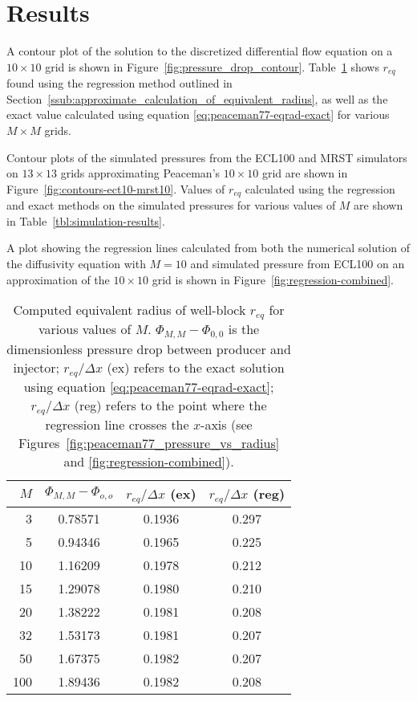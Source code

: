 
\section{Results} %
\label{sec:results}
A contour plot of the solution to the discretized differential flow equation on a $10 \times 10$ grid is shown in Figure~\ref{fig:pressure_drop_contour}. Table~\ref{tbl:peaceman-results} shows $r_{eq}$ found using the regression method outlined in Section~\ref{ssub:approximate_calculation_of_equivalent_radius}, as well as the exact value calculated using equation \eqref{eq:peaceman77-eqrad-exact} for various $M\times M$ grids.

Contour plots of the simulated pressures from the ECL100 and MRST simulators on $13\times 13$ grids approximating Peaceman's $10\times 10$ grid are shown in Figure~\ref{fig:contours-ect10-mrst10}. Values of $r_{eq}$ calculated using the regression and exact methods on the simulated pressures for various values of $M$ are shown in Table~\ref{tbl:simulation-results}.

A plot showing the regression lines calculated from both the numerical solution of the diffusivity equation with $M=10$ and simulated pressure from ECL100 on an approximation of the $10\times 10$ grid is shown in Figure~\ref{fig:regression-combined}.



\begin{table}[htbp]
    \centering
    \caption{Computed equivalent radius of well-block $r_{eq}$ for various values of $M$. $\Phi_{M,M} - \Phi_{0,0}$ is the dimensionless pressure drop between producer and injector; $r_{eq}/\Delta x$ (ex) refers to the exact solution using equation \eqref{eq:peaceman77-eqrad-exact}; $r_{eq} / \Delta x$ (reg) refers to the point where the regression line crosses the $x$-axis (see Figures~\ref{fig:peaceman77_pressure_vs_radius} and \ref{fig:regression-combined}).}
    \begin{tabular}{r|ccc}
        \toprule
        $M$ & $\Phi_{M,M} - \Phi_{o,o}$ & $r_{eq}/\Delta x$ (ex) & $r_{eq} / \Delta x$ (reg)  \\
        \midrule
        3   & 0.78571 & 0.1936 & 0.297 \\
        5   & 0.94346 & 0.1965 & 0.225 \\
        10  & 1.16209 & 0.1978 & 0.212 \\
        15  & 1.29078 & 0.1980 & 0.210 \\
        20  & 1.38222 & 0.1981 & 0.208 \\
        32  & 1.53173 & 0.1981 & 0.207 \\
        50  & 1.67375 & 0.1982 & 0.207 \\
        100 & 1.89436 & 0.1982 & 0.208 \\
        \bottomrule
    \end{tabular}
    \label{tbl:peaceman-results}
\end{table}

